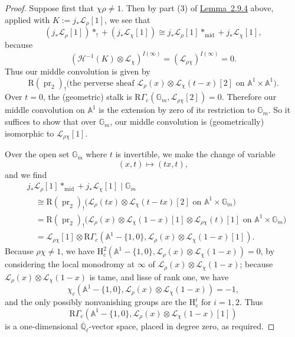 \begin{proof}
Suppose first that \(\chi\rho\neq 1\). Then by part (3) of \hyperref[lem:2.9.4]{Lemma~2.9.4} above,
applied with \(K:=j_*\mathcal{L}_\rho[1]\), we see that
\[
  (j_*\mathcal{L}_\rho[1])*_!+(j_*\mathcal{L}_\chi[1])
  \cong
  j_*\mathcal{L}_\rho[1]*_{\mathrm{mid}}+j_*\mathcal{L}_\chi[1],
\]
because
\[
  (\mathcal{H}^{-1}(K)\otimes\mathcal{L}_\chi)^{I(\infty)}
  =
  (\mathcal{L}_{\rho\chi})^{I(\infty)}
  =
  0.
\]
Thus our middle convolution is given by
\[
  \mathrm{R}(\operatorname{pr}_2)_!
  \bigl(\text{the perverse sheaf }
  \mathcal{L}_\rho(x)\otimes\mathcal{L}_\chi(t-x)[2]
  \text{ on }\mathbb{A}^1\times\mathbb{A}^1\bigr).
\]
Over \(t=0\), the (geometric) stalk is
\(\mathrm{R}\Gamma_c(\mathbb{G}_m,\mathcal{L}_{\rho\chi}[2])=0\). Therefore
our middle convolution on \(\mathbb{A}^1\) is the extension by zero of its
restriction to \(\mathbb{G}_m\). So it suffices to show that over
\(\mathbb{G}_m\), our middle convolution is (geometrically) isomorphic to
\(\mathcal{L}_{\rho\chi}[1]\).

Over the open set \(\mathbb{G}_m\) where \(t\) is invertible, we make the
change of variable
\[
  (x,t)\mapsto (tx,t),
\]
and we find
\[
  \begin{aligned}
    &j_*\mathcal{L}_\rho[1]*_{\mathrm{mid}}+j_*\mathcal{L}_\chi[1]
      \mid \mathbb{G}_m\\
    &\quad\cong
    \mathrm{R}(\operatorname{pr}_2)_!
    \bigl(\mathcal{L}_\rho(tx)\otimes\mathcal{L}_\chi(t-tx)[2]
    \text{ on }\mathbb{A}^1\times\mathbb{G}_m\bigr)\\
    &\quad=
    \mathrm{R}(\operatorname{pr}_2)_!
    \bigl(\mathcal{L}_\rho(x)\otimes\mathcal{L}_\chi(1-x)[1]
    \otimes\mathcal{L}_{\rho\chi}(t)[1]
    \text{ on }\mathbb{A}^1\times\mathbb{G}_m\bigr)\\
    &\quad=
    \mathcal{L}_{\rho\chi}[1]\otimes
    \mathrm{R}\Gamma_c(\mathbb{A}^1-\{1,0\},
    \mathcal{L}_\rho(x)\otimes\mathcal{L}_\chi(1-x)[1]).
  \end{aligned}
\]
Because \(\rho\chi\neq 1\), we have
\(\mathrm{H}^2_c(\mathbb{A}^1-\{1,0\},
\mathcal{L}_\rho(x)\otimes\mathcal{L}_\chi(1-x))=0\), by considering the
local monodromy at \(\infty\) of
\(\mathcal{L}_\rho(x)\otimes\mathcal{L}_\chi(1-x)\); because
\(\mathcal{L}_\rho(x)\otimes\mathcal{L}_\chi(1-x)\) is tame, and lisse of
rank one, we have
\[
  \chi_c(\mathbb{A}^1-\{1,0\},
  \mathcal{L}_\rho(x)\otimes\mathcal{L}_\chi(1-x))=-1,
\]
and the only possibly nonvanishing groups are the \(\mathrm{H}^i_c\) for
\(i=1,2\). Thus
\[
  \mathrm{R}\Gamma_c(\mathbb{A}^1-\{1,0\},
  \mathcal{L}_\rho(x)\otimes\mathcal{L}_\chi(1-x)[1])
\]
is a one-dimensional \(\overline{\mathbb{Q}}_\ell\)-vector space, placed in
degree zero, as required.


\end{proof}
